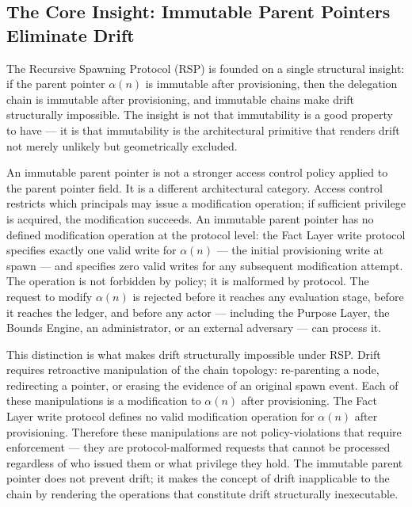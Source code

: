 \subsection{The Core Insight: Immutable Parent Pointers Eliminate Drift}
\label{sec:core-insight}

The Recursive Spawning Protocol (RSP) is founded on a single structural insight: if the parent pointer $\alpha(n)$ is immutable after provisioning, then the delegation chain is immutable after provisioning, and immutable chains make drift structurally impossible. The insight is not that immutability is a good property to have — it is that immutability is the architectural primitive that renders drift not merely unlikely but geometrically excluded.

An immutable parent pointer is not a stronger access control policy applied to the parent pointer field. It is a different architectural category. Access control restricts which principals may issue a modification operation; if sufficient privilege is acquired, the modification succeeds. An immutable parent pointer has no defined modification operation at the protocol level: the Fact Layer write protocol specifies exactly one valid write for $\alpha(n)$ — the initial provisioning write at spawn — and specifies zero valid writes for any subsequent modification attempt. The operation is not forbidden by policy; it is malformed by protocol. The request to modify $\alpha(n)$ is rejected before it reaches any evaluation stage, before it reaches the ledger, and before any actor — including the Purpose Layer, the Bounds Engine, an administrator, or an external adversary — can process it.

This distinction is what makes drift structurally impossible under RSP. Drift requires retroactive manipulation of the chain topology: re-parenting a node, redirecting a pointer, or erasing the evidence of an original spawn event. Each of these manipulations is a modification to $\alpha(n)$ after provisioning. The Fact Layer write protocol defines no valid modification operation for $\alpha(n)$ after provisioning. Therefore these manipulations are not policy-violations that require enforcement — they are protocol-malformed requests that cannot be processed regardless of who issued them or what privilege they hold. The immutable parent pointer does not prevent drift; it makes the concept of drift inapplicable to the chain by rendering the operations that constitute drift structurally inexecutable.

